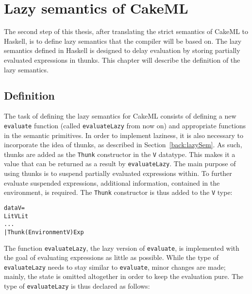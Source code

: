 \chapter{Lazy semantics of CakeML}
\label{lazySem}
The second step of this thesis, after translating the strict semantics of CakeML
to Haskell, is to define lazy semantics that the compiler will be based on.
The lazy semantics defined in Haskell is designed to delay evaluation by
storing partially evaluated expressions in thunks. This chapter will describe
the definition of the lazy semantics.

\section{Definition}
\label{lazySem:impl}

The task of defining the lazy semantics for CakeML consists of defining a new
\texttt{evaluate} function (called \texttt{evaluateLazy} from now on) and
appropriate functions in the semantic primitives.
In order to implement laziness, it is also necessary to incorporate the idea of
thunks, as described in Section~\ref{back:lazySem}. As such, thunks are added
as the \texttt{Thunk} constructor in the \texttt{V} datatype. This makes
it a value that can be returned as a result by
\texttt{evaluateLazy}. The main purpose of using thunks is to suspend partially
evaluated expressions within. To further evaluate suspended expressions,
additional information, contained in the environment, is required.
The \texttt{Thunk} constructor is thus added to the \texttt{V} type:

\begin{alltt}
  data V =
    LitV Lit
    ...
    | Thunk (Environment V) Exp
\end{alltt}

The function \texttt{evaluateLazy}, the lazy version of \texttt{evaluate}, is
implemented with the goal of evaluating expressions as little as possible. While
the type of \texttt{evaluateLazy} needs to stay similar to
\texttt{evaluate}, minor changes are made; mainly, the state is omitted
altogether in order to keep the evaluation pure. The type of
\texttt{evaluateLazy} is thus declared as follows:


